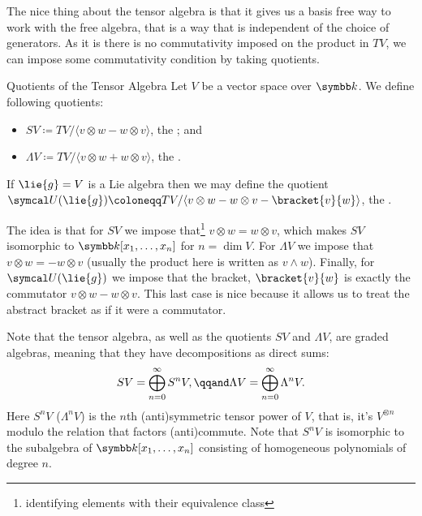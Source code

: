 The nice thing about the tensor algebra is that it gives us a basis free way to work with the free algebra, that is a way that is independent of the choice of generators.
As it is there is no commutativity imposed on the product in \(TV\), we can impose some commutativity condition by taking quotients.

\begin{dfn}{Quotients of the Tensor Algebra}{}
    Let \(V\) be a vector space over \(\field\).
    We define following quotients:
    \begin{itemize}
        \item \(SV \coloneqq TV/\langle v \otimes w - w \otimes v \rangle\), the ; and
        \item \(\Lambda V \coloneqq TV/\langle v \otimes w + w \otimes v \rangle\), the .
    \end{itemize}
    If \(\lie{g} = V\) is a Lie algebra then we may define the quotient \(\universalEnveloping(\lie{g}) \coloneqq TV/\langle v \otimes w - w \otimes v - \bracket{v}{w} \rangle\), the .
\end{dfn}

The idea is that for \(SV\) we impose that\footnote{identifying elements with their equivalence class} \(v \otimes w = w \otimes v\), which makes \(SV\) isomorphic to \(\field[x_1, \dotsc, x_n]\) for \(n = \dim V\).
For \(\Lambda V\) we impose that \(v \otimes w = -w\otimes v\) (usually the product here is written as \(v \wedge w\)).
Finally, for \(\universalEnveloping(\lie{g})\) we impose that the bracket, \(\bracket{v}{w}\) is exactly the commutator \(v \otimes w - w \otimes v\).
This last case is nice because it allows us to treat the abstract bracket as if it were a commutator.

Note that the tensor algebra, as well as the quotients \(SV\) and \(\Lambda V\), are graded algebras, meaning that they have decompositions as direct sums:
\begin{equation}
    SV = \bigoplus_{n = 0}^{\infty} S^nV, \qqand \Lambda V = \bigoplus_{n = 0}^{\infty} \Lambda^n V.
\end{equation}
Here \(S^nV\) (\(\Lambda^nV\)) is the \(n\)th (anti)symmetric tensor power of \(V\), that is, it's \(V^{\otimes n}\) modulo the relation that factors (anti)commute.
Note that \(S^nV\) is isomorphic to the subalgebra of \(\field[x_1, \dotsc, x_n]\) consisting of homogeneous polynomials of degree \(n\).

